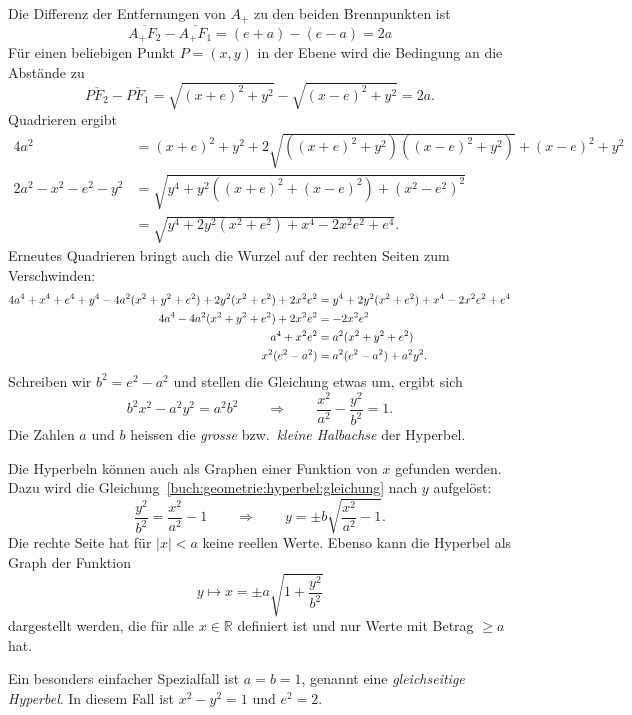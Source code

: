 Die Differenz der Entfernungen von $A_+$ zu den beiden Brennpunkten ist
\[
\overline{A_+F_2}
-
\overline{A_+F_1}
=
(e+a)-(e-a) = 2a
\]
Für einen beliebigen Punkt $P=(x,y)$ in der Ebene wird die Bedingung
an die Abstände zu
\[
\overline{PF_2}
-
\overline{PF_1}
=
\sqrt{(x+e)^2+y^2}
-
\sqrt{(x-e)^2+y^2}
=
2a.
\]
Quadrieren ergibt
\begin{align*}
4a^2
&=
(x+e)^2+y^2
+
2\sqrt{
((x+e)^2+y^2)
((x-e)^2+y^2)
}
+
(x-e)^2+y^2
\\
2a^2-x^2-e^2-y^2
&=
\sqrt{
y^4 + y^2((x+e)^2 + (x-e)^2) +(x^2-e^2)^2
}
\\
&=
\sqrt{y^4 + 2y^2 ( x^2+e^2) +x^4 - 2x^2e^2 + e^4}.
\end{align*}
Erneutes Quadrieren bringt auch die Wurzel auf der rechten Seiten
zum Verschwinden:
\begin{align}
4a^4 + x^4 + e^4 + y^4
-4a^2(x^2+y^2+e^2)
+2y^2(x^2+e^2)+2x^2e^2
&=
y^4+2y^2(x^2 +e^2) + x^4 -2x^2e^2+e^4
\notag
\\
4a^4
-4a^2(x^2+y^2+e^2)
+2x^2e^2
&=
-2x^2e^2
\notag
\\
a^4+x^2e^2&=a^2(x^2+y^2+e^2)
\notag
\\
x^2(e^2-a^2)&=a^2(e^2-a^2) + a^2y^2.
\notag
\end{align}
Schreiben wir $b^2=e^2-a^2$ und stellen die Gleichung etwas um,
ergibt sich
\begin{equation}
b^2x^2 - a^2y^2 = a^2b^2
\qquad\Rightarrow\qquad
\frac{x^2}{a^2} - \frac{y^2}{b^2} = 1.
\label{buch:geometrie:hyperbel:gleichung}
\end{equation}
Die Zahlen $a$ und $b$ heissen die {\em grosse} bzw.~{\em kleine Halbachse}
der Hyperbel.

Die Hyperbeln können auch als Graphen einer Funktion von $x$ gefunden werden.
Dazu wird die Gleichung~\eqref{buch:geometrie:hyperbel:gleichung}
nach $y$ aufgelöst:
\[
\frac{y^2}{b^2} = \frac{x^2}{a^2} - 1
\qquad\Rightarrow\qquad
y
=
\pm
b\sqrt{\frac{x^2}{a^2}-1}.
\]
Die rechte Seite hat für $|x|<a$ keine reellen Werte.
Ebenso kann die Hyperbel als Graph der Funktion
\[
y\mapsto x = \pm a\sqrt{1+\frac{y^2}{b^2}}
\]
dargestellt werden, die für alle $x\in\mathbb{R}$ definiert ist und
nur Werte mit Betrag $\ge a$ hat.

Ein besonders einfacher Spezialfall ist $a=b=1$, genannt eine
{\em gleichseitige Hyperbel}.
%
%
In diesem Fall ist $x^2-y^2=1$ und $e^2=2$.

